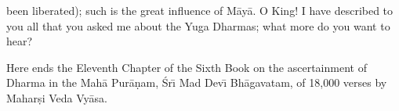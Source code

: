 been liberated); such is the great influence of M\=ay\=a. O King! I have described to you all that you asked me about the Yuga Dharmas; what more do you want to hear?

Here ends the Eleventh Chapter of the Sixth Book on the ascertainment of Dharma in the Mah\=a Pur\=a\d{n}am, \'Sr\={\i} Mad Dev\={\i} Bh\=agavatam, of 18,000 verses by Mahar\d{s}i Veda Vy\=asa.



